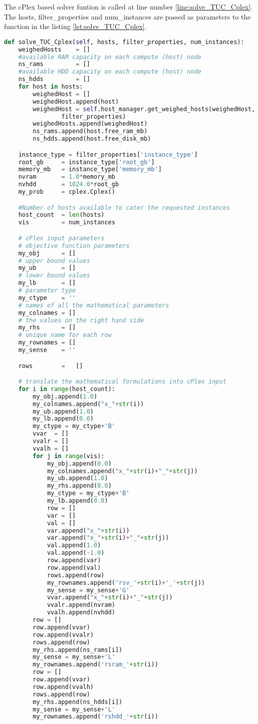The cPlex based solver funtion is called at line number \ref{line:solve_TUC_Cplex}. The hosts, filter\_properties and num\_instances are passed as parameters to the function in the listing \ref{lst:solve_TUC_Cplex}.
\newline
\begin{lstlisting}[frame=single, language=Python, caption={The cPlex based TUC\_scheduler's solve\_TUC\_Cplex function}, label={lst:solve_TUC_Cplex}, escapechar=|]
def solve_TUC_Cplex(self, hosts, filter_properties, num_instances):
	weighedHosts    = []
	#available RAM capacity on each compute (host) node
	ns_rams         = []
	#available HDD capacity on each compute (host) node
	ns_hdds         = []
	for host in hosts:
		weighedHost = []
		weighedHost.append(host)
		weighedHost = self.host_manager.get_weighed_hosts(weighedHost,
				filter_properties)
		weighedHosts.append(weighedHost)
		ns_rams.append(host.free_ram_mb)
		ns_hdds.append(host.free_disk_mb)

	instance_type = filter_properties['instance_type']
	root_gb     = instance_type['root_gb']
	memory_mb   = instance_type['memory_mb']
	nvram       = 1.0*memory_mb
	nvhdd       = 1024.0*root_gb
	my_prob     = cplex.Cplex()

	#Number of hosts available to cater the requested instances
	host_count  = len(hosts)
	vis         = num_instances

	# cPlex input parameters
	# objective function parameters
	my_obj      = []
	# upper bound values
	my_ub       = []
	# lower bound values
	my_lb       = []
	# parameter type
	my_ctype    = ''
	# names of all the mathematical parameters
	my_colnames = []
	# the values on the right hand side
	my_rhs      = []
	# unique name for each row
	my_rownames = []
	my_sense    = ''

	rows        =   []

	# translate the mathematical formulations into cPlex input
	for i in range(host_count):
		my_obj.append(1.0)
		my_colnames.append("x_"+str(i))
		my_ub.append(1.0)
		my_lb.append(0.0)
		my_ctype = my_ctype+'B'
		vvar  = []
		vvalr = []
		vvalh = []
		for j in range(vis):
			my_obj.append(0.0)
			my_colnames.append("x_"+str(i)+"_"+str(j))
			my_ub.append(1.0)
			my_rhs.append(0.0)
			my_ctype = my_ctype+'B'
			my_lb.append(0.0)
			row = []
			var = []
			val = []
			var.append("x_"+str(i))
			var.append("x_"+str(i)+"_"+str(j))
			val.append(1.0)
			val.append(-1.0)
			row.append(var)
			row.append(val)
			rows.append(row)
			my_rownames.append('rsv_'+str(i)+'_'+str(j))
			my_sense = my_sense+'G'
			vvar.append("x_"+str(i)+"_"+str(j))
			vvalr.append(nvram)
			vvalh.append(nvhdd)
		row = []
		row.append(vvar)
		row.append(vvalr)
		rows.append(row)
		my_rhs.append(ns_rams[i])
		my_sense = my_sense+'L'
		my_rownames.append('rsram_'+str(i))
		row = []
		row.append(vvar)
		row.append(vvalh)
		rows.append(row)
		my_rhs.append(ns_hdds[i])
		my_sense = my_sense+'L'
		my_rownames.append('rshdd_'+str(i))


\end{lstlisting}
